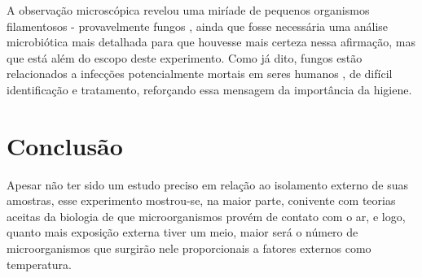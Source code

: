 \documentclass[12pt, titlepage]{article}
\begin{document}
A observação microscópica revelou uma miríade de pequenos organismos filamentosos - provavelmente fungos \cite{buckley2020fungal}, ainda que fosse necessária uma análise microbiótica mais detalhada para que houvesse mais certeza nessa afirmação, mas que está além do escopo deste experimento. Como já dito, fungos estão relacionados a infecções potencialmente mortais em seres humanos \cite{Benedict2016}, de difícil identificação e tratamento, reforçando essa mensagem da importância da higiene.

\section{Conclusão}
Apesar não ter sido um estudo preciso em relação ao isolamento externo de suas amostras, esse experimento mostrou-se, na maior parte, conivente com teorias aceitas da biologia de que microorganismos provém de contato com o ar, e logo, quanto mais exposição externa tiver um meio, maior será o número de microorganismos que surgirão nele proporcionais a fatores externos como temperatura.

\printbibliography
\end{document}
